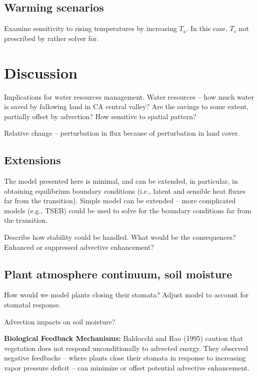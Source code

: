 \documentclass{article}
\begin{document}
    
    \subsection{Warming scenarios}

    Examine sensitivity to rising temperatures by increasing $T_a$.
    In this case, $T_s$ not prescribed by rather solver for.

    \section{Discussion}
    \label{sec:discussion}

    Implications for water resources management. 
    Water resources – how much water is saved by fallowing land in CA central valley? Are the savings to some extent, partially offset by advection? How sensitive to spatial pattern? 

    Relative change -- perturbation in flux because of perturbation in land cover. 

    \subsection{Extensions}

    The model presented here is minimal, and can be extended, in particular, in obtaining equilibrium boundary conditions (i.e., latent and sensible heat fluxes far from the transition).
    Simple model can be extended -- more complicated models (e.g., TSEB) could be used to solve for the boundary conditions far from the transition.

    Describe how stability could be handled. What would be the consequences? Enhanced or suppressed advective enhancement?

    \subsection{Plant atmosphere continuum, soil moisture}

    How would we model plants closing their stomata?
    Adjust model to account for stomatal response. 

    Advection impacts on soil moisture? 

    \textbf{Biological Feedback Mechanisms:} Baldocchi and Rao (1995)
    caution that vegetation does not respond unconditionally to advected energy. 
    They observed negative feedbacks -- where plants close their stomata in response to increasing vapor pressure deficit -- can minimize or offset potential advective enhancement. 
\end{document}

